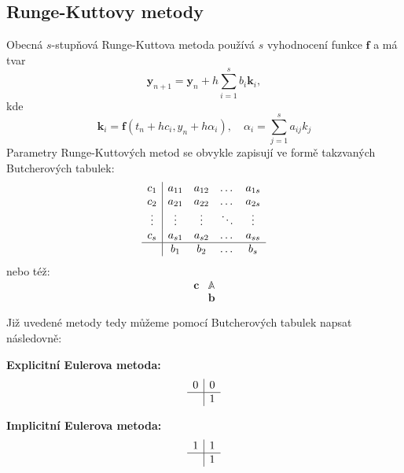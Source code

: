 \documentclass[a4paper, 12pt]{book}
\theoremstyle{definition}
\def\vc#1{\mathbf{\boldsymbol{#1}}}     %
\def\tn#1{{\mathbb{#1}}}    %
\begin{document}
\subsection{Runge-Kuttovy metody}
Obecná $s$-stupňová Runge-Kuttova metoda používá $s$ vyhodnocení funkce $\vc f$ a má tvar
\[
  \vc y_{n+1} = \vc y_n + h\sum_{i=1}^s b_i \vc k_i,
\]
kde 
\[
  \vc k_i = \vc f(t_n+ hc_i, y_n + h\alpha_i),\quad \alpha_i = \sum_{j=1}^s a_{ij} k_j
\]
Parametry Runge-Kuttových metod se obvykle zapisují ve formě takzvaných Butcherových tabulek:
\begin{equation}
    \begin{array}{c|cccc}
        c_1 & a_{11} & a_{12} & \dots & a_{1s} \\
        c_2 & a_{21} & a_{22} & \dots & a_{2s} \\
        \vdots & \vdots & \vdots & \ddots & \vdots \\
        c_s & a_{s1} & a_{s2} & \dots & a_{ss} \\
        \hline
             & b_{1} & b_{2} & \dots & b_{s} \\
    \end{array}
\end{equation}
nebo též:
\begin{equation}
    \begin{array}{c|c}
        \vc c & \tn A\\
              & \vc b 
    \end{array}
\end{equation}

Již uvedené metody tedy můžeme pomocí Butcherových tabulek napsat následovně:

{\bf Explicitní Eulerova metoda:}
\begin{equation}
    \begin{array}{l|l}
        0 & 0  \\
        \hline
             & 1 \\
    \end{array}
\end{equation}

{\bf Implicitní Eulerova metoda:}
\begin{equation}
    \begin{array}{l|l}
        1 & 1  \\
        \hline
             & 1 \\
    \end{array}
\end{equation}
\end{document}

